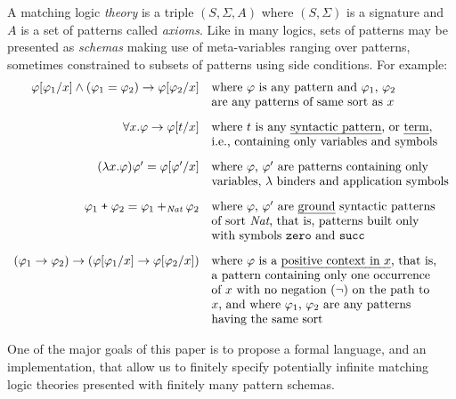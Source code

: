 \documentclass[UTF8,11pt]{article}
\theoremstyle{plain}
\theoremstyle{definition}
\theoremstyle{remark}
\newcommand{\Nat}{\textit{Nat}}
\begin{document}
A matching logic \emph{theory} is a triple $(S, \Sigma, A)$ where
$(S,\Sigma)$ is a signature and $A$ is a set of patterns called \emph{axioms}.
Like in many logics, sets of patterns may be presented as \emph{schemas}
making use of meta-variables ranging over patterns, sometimes constrained
to subsets of patterns using side conditions.
For example:
$$
\begin{array}{rl}
\varphi[\varphi_1/x] \wedge (\varphi_1 = \varphi_2) \rightarrow \varphi[\varphi_2/x]
&\textrm{where $\varphi$ is any pattern and $\varphi_1$, $\varphi_2$} \\
& \textrm{are any patterns of same sort as $x$}
\\[2ex]
\forall x . \varphi \rightarrow \varphi[t/x]
&\textrm{where $t$ is any \emph{syntactic pattern}, or \emph{term}}, \\
& \textrm{i.e., containing only variables and symbols}
\\[2ex]
(\lambda x . \varphi)\varphi' = \varphi[\varphi'/x]
& \textrm{where $\varphi$, $\varphi'$ are patterns containing only}
\\
& \textrm{variables, $\lambda$ binders and application symbols}
\\[2ex]
\varphi_1 \mathrel{\texttt{+}} \varphi_2 = \varphi_1 +_\Nat \varphi_2
& \textrm{where $\varphi$, $\varphi'$ are \emph{ground} syntactic patterns}
\\
&\textrm{of sort $\Nat$, that is, patterns built only}
\\
&\textrm{with symbols \texttt{zero} and \texttt{succ}}
\\[2ex]
(\varphi_1 \rightarrow \varphi_2) \rightarrow
(\varphi[\varphi_1 / x] \rightarrow \varphi[\varphi_2 / x])
& \textrm{where $\varphi$ is a \emph{positive context in $x$}, that is,}
\\
& \textrm{a pattern
containing only one occurrence}
\\
&\textrm{of $x$ with no negation ($\neg$) on the path to}
\\
&\textrm{$x$, and where $\varphi_1$, $\varphi_2$ are any patterns}
\\
&\textrm{having the same sort}
\end{array}
$$

One of the major goals of this paper is to propose a formal language,
and an implementation, that allow us to finitely specify potentially
infinite matching logic theories presented with finitely many pattern schemas.

\end{document}
